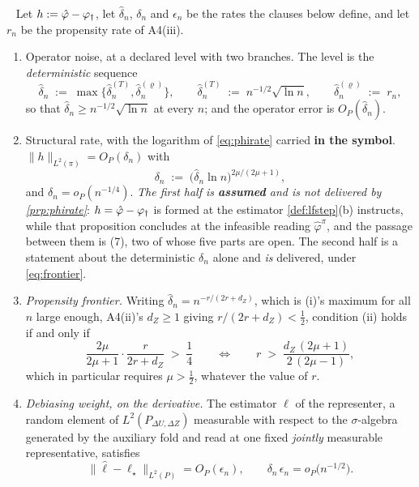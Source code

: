 \begin{assumption}\label{ass:rates}~
Let $h:=\hat\varphi-\varphi_{\dagger}$, let $\hat\delta_n$, $\delta_n$ and $\epsilon_n$ be the rates the clauses
below define, and let $r_n$ be the propensity rate of A4(iii).
\begin{enumerate}
\item[(i)] Operator noise, at a declared level with two branches. The level is the
\emph{deterministic} sequence
\[
\hat\delta_n\;:=\;\max\big\{\hat\delta_n^{(T)},\hat\delta_n^{(\varrho)}\big\},
\qquad
\hat\delta_n^{(T)}\;:=\;n^{-1/2}\sqrt{\ln n},
\qquad
\hat\delta_n^{(\varrho)}\;:=\;r_n ,
\]
so that $\hat\delta_n\ge n^{-1/2}\sqrt{\ln n}$ at every $n$; and the operator error is
$O_P(\hat\delta_n)$.
\item[(ii)] Structural rate, with the logarithm of \eqref{eq:phirate} carried \textbf{in the
symbol}. $\|h\|_{L^2(\pi)}=O_P(\delta_n)$ with
\[
\delta_n\;:=\;\big(\hat\delta_n\ln n\big)^{2\mu/(2\mu+1)} ,
\]
and $\delta_n=o_P(n^{-1/4})$. \emph{The first half is \textbf{assumed} and is not delivered by
\cref{prp:phirate}}: $h=\hat\varphi-\varphi_{\dagger}$ is formed at the estimator \cref{def:lfstep}\textup{(b)}
instructs, while that proposition concludes at the infeasible reading $\hat\varphi^{\pi}$, and the
passage between them is \textup{(7)}, two of whose five parts are open. The
second half is a statement about the deterministic $\delta_n$ alone and \emph{is} delivered, under
\eqref{eq:frontier}.
\item[(iii)] \emph{Propensity frontier.} Writing $\hat\delta_n=n^{-r/(2r+d_Z)}$, which is
\textup{(i)}'s maximum for all $n$ large enough, A4(ii)'s $d_Z\ge1$ giving $r/(2r+d_Z)<\tfrac12$, 
condition (ii) holds if and only if
\begin{equation}\label{eq:frontier}
\frac{2\mu}{2\mu+1}\cdot\frac{r}{2r+d_Z}\;>\;\frac14
\qquad\Longleftrightarrow\qquad
r\;>\;\frac{d_Z\,(2\mu+1)}{2\,(2\mu-1)},
\end{equation}
which in particular requires $\mu>\tfrac12$, whatever the value of $r$.
\item[(iv)] \emph{Debiasing weight, on the derivative.} The estimator $\hat\ell$ of the representer, a
random element of $L^{2}(P_{\Delta U,\Delta Z})$ measurable with respect to the $\sigma$-algebra generated
by the auxiliary fold and read at one fixed \emph{jointly} measurable representative, satisfies
\[
\big\|\hat\ell-\ell_\star\big\|_{L^{2}(P)}=O_P(\epsilon_n),
\qquad \delta_n\,\epsilon_n=o_P\big(n^{-1/2}\big).
\]

\end{enumerate}
\end{assumption}
